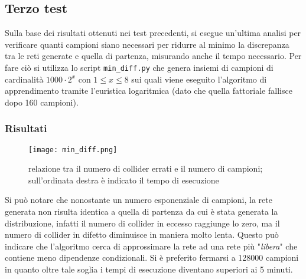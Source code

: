 \subsection{Terzo test}

Sulla base dei risultati ottenuti nei test precedenti, si esegue un'ultima analisi per verificare
quanti campioni siano necessari per ridurre al minimo la discrepanza tra le reti generate e quella
di partenza, misurando anche il tempo necessario. Per fare ciò si utilizza lo script
\texttt{min\_diff.py} che genera insiemi di campioni di cardinalità $1000 \cdot 2^x$ con $1 \le x
    \le 8$ sui quali viene eseguito l'algoritmo di apprendimento tramite l'euristica logaritmica (dato
che quella fattoriale fallisce dopo 160 campioni).

\subsubsection{Risultati}

\begin{figure}[h]
    \centering
    \texttt{[image: min\_diff.png]}
    \caption{relazione tra il numero di collider errati e il numero di campioni; sull'ordinata destra è indicato il tempo di esecuzione}
    \label{fig:test3}
\end{figure}

Si può notare che nonostante un numero esponenziale di campioni, la rete generata non risulta
identica a quella di partenza da cui è stata generata la distribuzione, infatti il numero di
collider in eccesso raggiunge lo zero, ma il numero di collider in difetto diminuisce in maniera
molto lenta. Questo può indicare che l'algoritmo cerca di approssimare la rete ad una rete più
"\textit{libera}" che contiene meno dipendenze condizionali. Si è preferito fermarsi a 128000
campioni in quanto oltre tale soglia i tempi di esecuzione diventano superiori ai 5 minuti.
